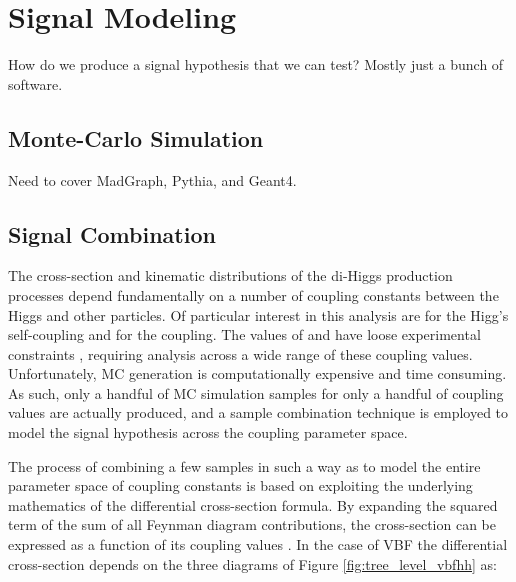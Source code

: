 \chapter{Signal Modeling}

How do we produce a signal hypothesis that we can test?
Mostly just a bunch of software.

\section{Monte-Carlo Simulation}

    Need to cover MadGraph, Pythia, and Geant4.

\section{Signal Combination}

    The cross-section and kinematic distributions of the di-Higgs production processes depend fundamentally on a number of coupling constants between the Higgs and other particles.
    Of particular interest in this analysis are \kl for the Higg's self-coupling and \kvv for the \HHVV coupling.
    The values of \kl and \kvv have loose experimental constraints \cite{EXOT-2016-31} \cite{HDBS-2018-18-witherratum} \cite{ATLAS-CONF-2019-049}, requiring analysis across a wide range of these coupling values.
    Unfortunately, MC generation is computationally expensive and time consuming.
    As such, only a handful of MC simulation samples for only a handful of coupling values are actually produced, and a sample combination technique is employed to model the signal hypothesis across the coupling parameter space.

    The process of combining a few samples in such a way as to model the entire parameter space of coupling constants is based on exploiting the underlying mathematics of the differential cross-section formula.
    By expanding the squared term of the sum of all Feynman diagram contributions, the cross-section can be expressed as a function of its coupling values \cite{ATLAS-CONF-2019-049}.
    In the case of VBF the differential cross-section depends on the three diagrams of Figure \ref{fig:tree_level_vbfhh} as:


